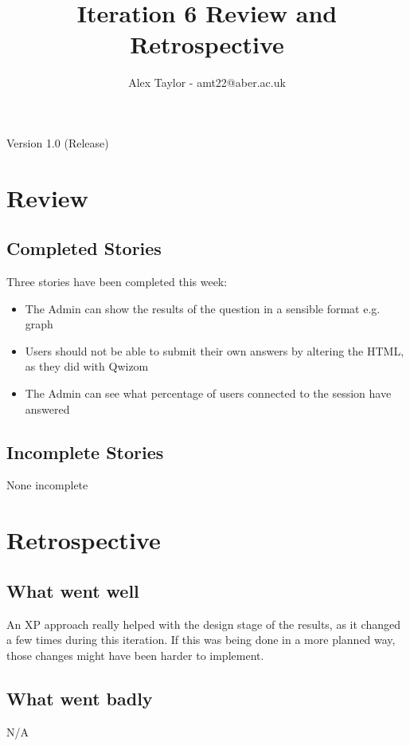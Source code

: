 \documentclass{article}
\title{Iteration 6 Review and Retrospective}
\author{Alex Taylor - amt22@aber.ac.uk}
\begin{document}
\maketitle
\begin{center}
	Version 1.0 (Release)
\end{center}
\tableofcontents
\thispagestyle{empty}
\newpage

\section{Review}
\subsection{Completed Stories}
Three stories have been completed this week:
\begin{itemize}
	\item The Admin can show the results of the question in a sensible format e.g. graph
	\item Users should not be able to submit their own answers by altering the HTML, as they did with Qwizom
	\item The Admin can see what percentage of users connected to the session have answered
\end{itemize}
\subsection{Incomplete Stories}
None incomplete
\newpage

\section{Retrospective}
\subsection{What went well}
An XP approach really helped with the design stage of the results, as it changed a few times during this iteration. If this was being done in a more planned way, those changes might have been harder to implement.
\subsection{What went badly}
N/A
\end{document}
